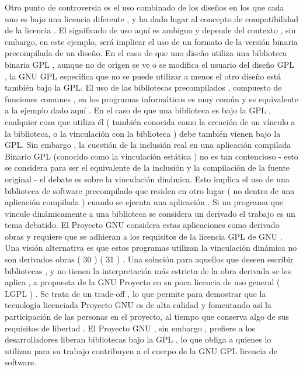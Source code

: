 \documentclass[a4paper,11pt]{article}
\begin{document}
Otro punto de controversia es el uso combinado de los diseños en los que cada uno es bajo
una licencia diferente , y ha dado lugar al concepto de compatibilidad de la licencia . El significado
de uso aquí es ambiguo y depende del contexto , sin embargo, en este ejemplo, será
implicar el uso de un formato de la versión binaria precompilada de un diseño. En el caso de que uno
diseño utiliza una biblioteca binaria GPL , aunque no de origen se ve o se modifica
el usuario del diseño GPL , la GNU GPL especifica que no se puede utilizar a menos
el otro diseño está también bajo la GPL. El uso de las bibliotecas precompilados , compuesto
de funciones comunes , en los programas informáticos es muy común y es equivalente a la
ejemplo dado aquí . En el caso de que una biblioteca es bajo la GPL , cualquier cosa que utiliza
él ( también conocida como la creación de un vínculo a la biblioteca, o la vinculación con la biblioteca ) debe
también vienen bajo la GPL.
Sin embargo , la cuestión de la inclusión real en una aplicación compilada
Binario GPL (conocido como la vinculación estática ) no es tan contencioso - esto se considera
para ser el equivalente de la inclusión y la compilación de la fuente original - el debate
es sobre la vinculación dinámica. Esto implica el uso de una biblioteca de software precompilado que residen
en otro lugar ( no dentro de una aplicación compilada ) cuando se ejecuta una aplicación .
Si un programa que vincule dinámicamente a una biblioteca se considera un derivado
el trabajo es un tema debatido. El Proyecto GNU considera estas aplicaciones como derivado
obras y requiere que se adhieran a los requisitos de la licencia GPL de GNU .
Una visión alternativa es que estos programas utilizan la vinculación dinámica no son derivados
obras ( 30 ) ( 31 ) . Una solución para aquellos que deseen escribir bibliotecas , y no tienen la
interpretación más estricta de la obra derivada se les aplica , a propuesta de la GNU
Proyecto en su poca licencia de uso general ( LGPL ) . Se trata de un trade-off , lo que permite
para demostrar que la tecnología licenciada Proyecto GNU es de alta calidad y
fomentando así la participación de las personas en el proyecto, al tiempo que conserva algo de
sus requisitos de libertad . El Proyecto GNU , sin embargo , prefiere a los desarrolladores liberan
bibliotecas bajo la GPL , lo que obliga a quienes lo utilizan para su trabajo contribuyen a
el cuerpo de la GNU GPL licencia de software.
\end{document}
